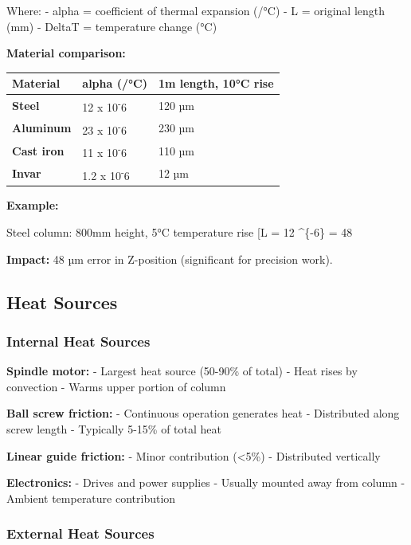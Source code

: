 \documentclass[
]{article}
\begin{document}
Where: - alpha = coefficient of thermal expansion (/°C) - L = original
length (mm) - DeltaT = temperature change (°C)

\textbf{Material comparison:}

{\def\LTcaptype{} %
\begin{longtable}[]{@{}lll@{}}
\toprule\noalign{}
Material & alpha (/°C) & 1m length, 10°C rise \\
\midrule\noalign{}
\endhead
\bottomrule\noalign{}
\endlastfoot
\textbf{Steel} & 12 x 10\textsuperscript{-}6 & 120 µm \\
\textbf{Aluminum} & 23 x 10\textsuperscript{-}6 & 230 µm \\
\textbf{Cast iron} & 11 x 10\textsuperscript{-}6 & 110 µm \\
\textbf{Invar} & 1.2 x 10\textsuperscript{-}6 & 12 µm \\
\end{longtable}
}

\textbf{Example:}

Steel column: 800mm height, 5°C temperature rise {[}\Delta L = 12
\^{}\{-6\}   = 48 \text{ µm}{]}

\textbf{Impact:} 48 µm error in Z-position (significant for precision
work).

\subsection{Heat Sources}\label{heat-sources}

\subsubsection{Internal Heat Sources}\label{internal-heat-sources}

\textbf{Spindle motor:} - Largest heat source (50-90\% of total) - Heat
rises by convection - Warms upper portion of column

\textbf{Ball screw friction:} - Continuous operation generates heat -
Distributed along screw length - Typically 5-15\% of total heat

\textbf{Linear guide friction:} - Minor contribution (\textless5\%) -
Distributed vertically

\textbf{Electronics:} - Drives and power supplies - Usually mounted away
from column - Ambient temperature contribution

\subsubsection{External Heat Sources}\label{external-heat-sources}
\end{document}
